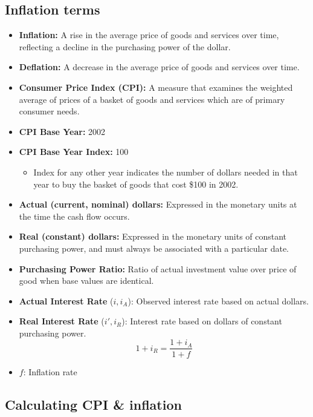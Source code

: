 \subsection{Inflation terms}
\begin{terminology}
    \begin{itemize}
        \item \textbf{Inflation:} A rise in the average price of goods and services over time, reflecting a decline in the purchasing power of the dollar.
        \item \textbf{Deflation:} A decrease in the average price of goods and services over time.
        \item \textbf{Consumer Price Index (CPI):} A measure that examines the weighted average of prices of a basket of goods and services which are of primary consumer needs.
        \item \textbf{CPI Base Year:} 2002
        \item \textbf{CPI Base Year Index:} 100
        \begin{itemize}
            \item Index for any other year indicates the number of dollars needed in that year to buy the basket of goods that cost \$100 in 2002.
        \end{itemize}
        \item \textbf{Actual (current, nominal) dollars:} Expressed in the monetary units at the time the cash flow occurs.
        \item \textbf{Real (constant) dollars:} Expressed in the monetary units of constant purchasing power, and must always be associated with a particular date.
        \item \textbf{Purchasing Power Ratio:} Ratio of actual investment value over price of good when base values are identical.
        \item \textbf{Actual Interest Rate} (\(i, i_A\)): Observed interest rate based on actual dollars.
        \item \textbf{Real Interest Rate} (\(i', i_R\)): Interest rate based on dollars of constant purchasing power.
        \begin{equation}
            1 + i_R = \frac{1 + i_A}{1 + f}
        \end{equation}
        \item \(f\): Inflation rate
    \end{itemize}
\end{terminology}

\subsection{Calculating CPI \& inflation}
